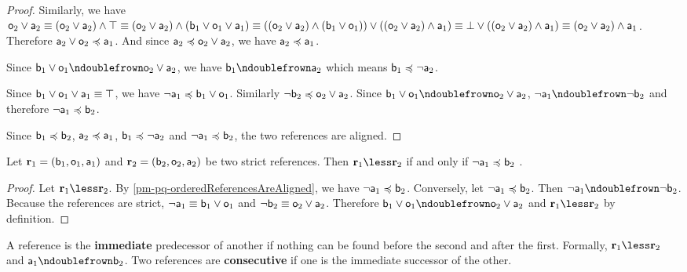 \begin{mathSection}
\begin{proof}
		Similarly, we have $\stmt[o]_2 \OR \stmt[a]_2 \equiv (\stmt[o]_2 \OR \stmt[a]_2) \AND \certainty \equiv (\stmt[o]_2 \OR \stmt[a]_2) \AND (\stmt[b]_1 \OR \stmt[o]_1 \OR \stmt[a]_1) \equiv ((\stmt[o]_2 \OR \stmt[a]_2) \AND (\stmt[b]_1 \OR \stmt[o]_1)) \OR ((\stmt[o]_2 \OR \stmt[a]_2) \AND \stmt[a]_1) \equiv \impossibility \OR ((\stmt[o]_2 \OR \stmt[a]_2) \AND \stmt[a]_1) \equiv (\stmt[o]_2 \OR \stmt[a]_2) \AND \stmt[a]_1$. Therefore $\stmt[a]_2 \OR \stmt[o]_2 \narrower \stmt[a]_1$. And since $\stmt[a]_2 \narrower \stmt[o]_2 \OR \stmt[a]_2$, we have $\stmt[a]_2 \narrower \stmt[a]_1$.
		
		Since $\stmt[b]_1 \OR \stmt[o]_1 \ncomp \stmt[o]_2 \OR \stmt[a]_2$, we have $\stmt[b]_1 \ncomp \stmt[a]_2$ which means $\stmt[b]_1 \narrower \NOT \stmt[a]_2$.
		
		Since $\stmt[b]_1 \OR \stmt[o]_1 \OR \stmt[a]_1 \equiv \certainty$, we have $\NOT \stmt[a]_1 \narrower \stmt[b]_1 \OR \stmt[o]_1$. Similarly $\NOT \stmt[b]_2 \narrower \stmt[o]_2 \OR \stmt[a]_2$. Since $\stmt[b]_1 \OR \stmt[o]_1 \ncomp \stmt[o]_2 \OR \stmt[a]_2$, $\NOT \stmt[a]_1 \ncomp \NOT \stmt[b]_2$ and therefore $\NOT \stmt[a]_1 \narrower \stmt[b]_2$.
		
		Since $\stmt[b]_1 \narrower \stmt[b]_2$, $\stmt[a]_2 \narrower \stmt[a]_1$, $\stmt[b]_1 \narrower \NOT \stmt[a]_2$ and $\NOT \stmt[a]_1 \narrower \stmt[b]_2$, the two references are aligned.
	\end{proof}
	\begin{prop}\label{pm-pq-strictReferencesOrderingCondition}
		Let $\refStmt_1 = ( \stmt[b]_1, \stmt[o]_1, \stmt[a]_1 )$ and $\refStmt_2 = ( \stmt[b]_2, \stmt[o]_2, \stmt[a]_2 )$ be two strict references. Then $\refStmt_1 \less \refStmt_2$ if and only if $\NOT \stmt[a]_1 \narrower \stmt[b]_2$ .
	\end{prop}
	\begin{proof}
		Let $\refStmt_1 \less \refStmt_2$. By \ref{pm-pq-orderedReferencesAreAligned}, we have $\NOT \stmt[a]_1 \narrower \stmt[b]_2$. Conversely, let $\NOT \stmt[a]_1 \narrower \stmt[b]_2$. Then $\NOT \stmt[a]_1 \ncomp \NOT \stmt[b]_2$. Because the references are strict, $\NOT \stmt[a]_1 \equiv \stmt[b]_1 \OR \stmt[o]_1$ and $\NOT \stmt[b]_2 \equiv \stmt[o]_2 \OR \stmt[a]_2$. Therefore $\stmt[b]_1 \OR \stmt[o]_1 \ncomp \stmt[o]_2 \OR \stmt[a]_2$ and $\refStmt_1 \less \refStmt_2$ by definition.
	\end{proof}
	
	\begin{defn}
		A reference is the \textbf{immediate} predecessor of another if nothing can be found before the second and after the first. Formally, $\refStmt_1 \less \refStmt_2$ and $\stmt[a]_1 \ncomp \stmt[b]_2$. Two references are \textbf{consecutive} if one is the immediate successor of the other.
	\end{defn}
	

\end{mathSection}
